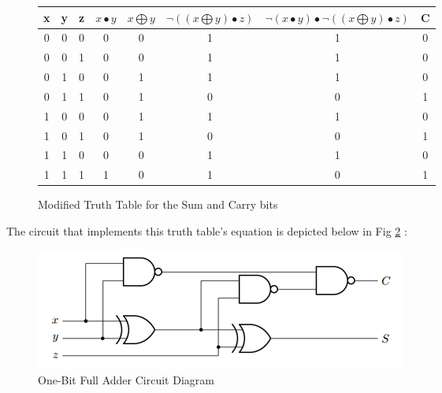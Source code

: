 \documentclass[10pt]{article}
\begin{document}
\begin{figure} [H]
	\begin{table}[H]
		\centering
		\begin{tabular}{||c c c c c c c c||} 
			\hline
			x & y &  z & $x \bullet y$ & $x \bigoplus y$ & $\lnot ((x \bigoplus y) \bullet z)$ & $ \lnot(x \bullet y) \bullet \lnot ((x \bigoplus y) \bullet z)$ & C\\ [0.5ex] 
			\hline\hline
			0 & 0 & 0 & 0 & 0 & 1 & 1 & 0\\ 
			0 & 0 & 1 & 0 & 0 & 1 & 1 & 0\\
			0 & 1 & 0 & 0 & 1 & 1 & 1 & 0\\
			0 & 1 & 1 & 0 & 1 & 0 & 0 & 1\\
			1 & 0 & 0 & 0 & 1 & 1 & 1 & 0\\
			1 & 0 & 1 & 0 & 1 & 0 & 0 & 1\\
			1 & 1 & 0 & 0 & 0 & 1 & 1 & 0\\
			1 & 1 & 1 & 1 & 0 & 1 & 0 & 1\\[1ex] 
			\hline
		\end{tabular}
	\end{table}
	\caption{Modified Truth Table for the Sum and Carry bits}
	\label{mod}
\end{figure}

The circuit that implements this truth table's equation is depicted below in Fig \ref{fig:circuit} :

\begin{centering}
	\begin{figure} [H]
		\centering
		\includegraphics[scale=0.75]{images/fulladder_2.png}
		\caption{One-Bit Full Adder Circuit Diagram}
		\label{fig:circuit}
	\end{figure}
\end{centering}

\medskip

\end{document}
